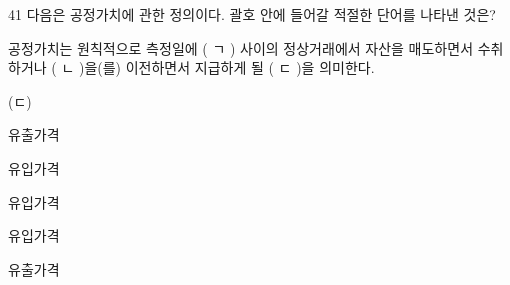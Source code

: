 \begin{question}{41}
다음은 공정가치에 관한 정의이다. 괄호 안에 들어갈 적절한 단어를 나타낸 것은?
\begin{framedtext}
공정가치는 원칙적으로 측정일에 ( ㄱ ) 사이의 정상거래에서 자산을 매도하면서 수취하거나 ( ㄴ )을(를) 이전하면서 지급하게 될 ( ㄷ )을 의미한다.
\end{framedtext}

\noindent\hspace*{2em}(ㄷ)\par
\begin{choices}
  \item {}유출가격
  \item {}유입가격
  \item {}유입가격
  \item {}유입가격
  \item {}유출가격
\end{choices}
\end{question}
